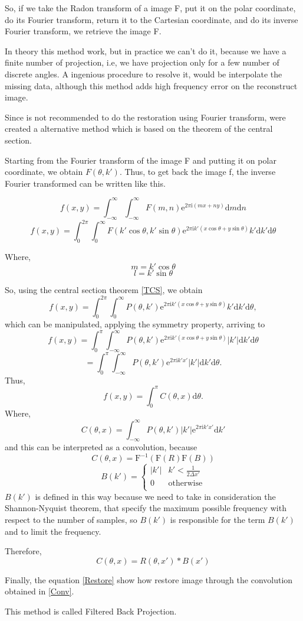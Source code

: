 So, if we take the Radon transform of a image F, put it on the polar coordinate, do its Fourier transform, return it to the Cartesian coordinate, and do its inverse Fourier transform, we retrieve the image F.

In theory this method work, but in practice we can't do it, because we have a finite number of projection, i.e, we have projection only for a few number of discrete angles. A ingenious procedure to resolve it, would be interpolate the missing data, although this method adds high frequency error on the reconstruct image.

Since is not recommended to do the restoration using Fourier transform, were created a alternative method which is based on the theorem of the central section. 

Starting from the Fourier transform of the image F and putting it on polar coordinate, we obtain $F(\theta, k')$. Thus, to get back the image f, the inverse Fourier transformed can be written like this.

\[ f(x,y) = \int_{-\infty}^\infty{\int_{-\infty}^\infty {F(m,n)\mathrm{e}^{2\pi\mathrm{i}(mx+ny)} \mathrm{d}m} \mathrm{d}n} \]
\[ f(x,y) = \int_{0}^{2\pi}{\int_{0}^\infty {F(k'\cos\theta,k'\sin\theta)\mathrm{e}^{2\pi\mathrm{i}k'(x \cos\theta+y\sin\theta)}k'\mathrm{d}k'} \mathrm{d}\theta} \]

Where,
\[ m = k'\cos\theta \]
 \[  l = k'\sin\theta\]

So, using the central section theorem \eqref{TCS}, we obtain
\[ f(x,y) = \int_{0}^{2\pi}{\int_{0}^\infty {P(\theta,k')\mathrm{e}^{2\pi\mathrm{i}k'(x\cos\theta+y\sin\theta)}k'\mathrm{d}k'} \mathrm{d}\theta}, \]
which can be manipulated, applying the symmetry property, arriving to
\[ f(x,y) = \int_{0}^{\pi}{\int_{-\infty}^\infty {P(\theta,k')\mathrm{e}^{2\pi\mathrm{i}k'(x\cos\theta+y\sin\theta)}|k'|\mathrm{d}k'} \mathrm{d}\theta} \]
\[ = \int_{0}^{\pi}{\int_{-\infty}^\infty {P(\theta,k')\mathrm{e}^{2\pi\mathrm{i}k'x'}|k'|\mathrm{d}k'} \mathrm{d}\theta} .\]
Thus,
\begin{equation}\label{Restore}
f(x,y) = \int_{0}^{\pi}{C(\theta,x)\mathrm{d}\theta .}
\end{equation}
Where,
\[ C(\theta,x) = \int_{-\infty}^\infty {P(\theta,k')|k'|\mathrm{e}^{2\pi\mathrm{i}k'x'}\mathrm{d}k' }\] 
and this can be interpreted as a convolution, because
\[ C(\theta,x) =  \mathrm{F}^{-1}(\mathrm{F}(R)\mathrm{F}(B)) \]
\[ B(k') = \begin{cases}  |k'| &  k'<\frac{1}{2\Delta x'}\\
                            0  & \text{otherwise}\\  \end{cases} \]
$B(k')$ is defined in this way because  we need to take in consideration the Shannon-Nyquist theorem, that specify the maximum possible frequency with respect to the number of samples, so $B(k')$ is responsible for the term $B(k')$ and to limit the frequency.

Therefore,
\begin{equation}\label{Conv}
C(\theta,x) = R(\theta,x')*B(x')
\end{equation}

Finally, the equation \eqref{Restore} show how restore image through the convolution obtained in \eqref{Conv}.

This method is called Filtered Back Projection.
